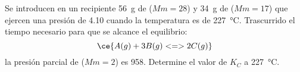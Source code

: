 Se introducen en un recipiente \SI{56}{\gram} de  ($Mm=28$) y \SI{34}{\gram} de  ($Mm=17$) que ejercen una presión de \SI{4,10}{\atm} cuando la temperatura es de \SI{227}{\celsius}. Trascurrido el tiempo necesario para que se alcance el equilibrio:
$$
	\ce{A(g) + 3B(g) <=> 2C(g)}
$$
la presión parcial de  ($Mm=2$) es \SI{958}{\torr}. Determine el valor de $K_C$ a \SI{227}{\celsius}.
